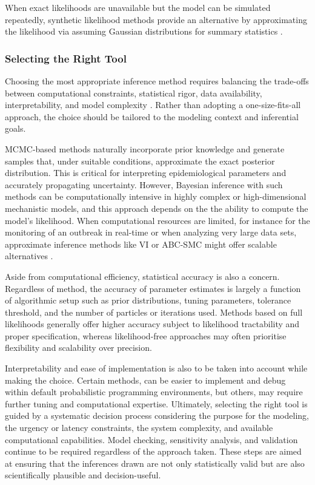 \documentclass{article}
\begin{document}
When exact likelihoods are unavailable but the model can be simulated repeatedly, synthetic likelihood methods provide an alternative by approximating the likelihood via assuming Gaussian distributions for summary statistics \citep{wood2010statistical, price2018bayesian}. 

\subsubsection{Selecting the Right Tool}

Choosing the most appropriate inference method requires balancing the trade-offs between computational constraints, statistical rigor, data availability, interpretability, and model complexity \citep{funk2020choices}. Rather than adopting a one-size-fits-all approach, the choice should be tailored to the modeling context and inferential goals. 

MCMC-based methods naturally incorporate prior knowledge and generate samples that, under suitable conditions, approximate the exact posterior distribution. This is critical for interpreting epidemiological parameters and accurately propagating uncertainty. However, Bayesian inference with such methods can be computationally intensive in highly complex or high-dimensional mechanistic models, and this approach depends on the the ability to compute the model's likelihood. When computational resources are limited, for instance for the monitoring of an outbreak in real-time or when analyzing very large data sets, approximate inference methods like VI or ABC-SMC might offer scalable alternatives \citep{chatzilena2019contemporary, engebretsen2023real}.

Aside from computational efficiency, statistical accuracy is also a concern. Regardless of method, the accuracy of parameter estimates is largely a function of algorithmic setup such as prior distributions, tuning parameters, tolerance threshold, and the number of particles or iterations used. Methods based on full likelihoods generally offer higher accuracy subject to likelihood tractability and proper specification, whereas likelihood-free approaches may often prioritise flexibility and scalability over precision. 

Interpretability and ease of implementation is also to be taken into account while making the choice. Certain methods, can be easier to implement and debug within default probabilistic programming environments, but others, may require further tuning and computational expertise. Ultimately, selecting the right tool is guided by a systematic decision process considering the purpose for the modeling, the urgency or latency constraints, the system complexity, and available computational capabilities. Model checking, sensitivity analysis, and validation continue to be required regardless of the approach taken. These steps are aimed at ensuring that the inferences drawn are not only statistically valid but are also scientifically plausible and decision-useful.
\end{document}
